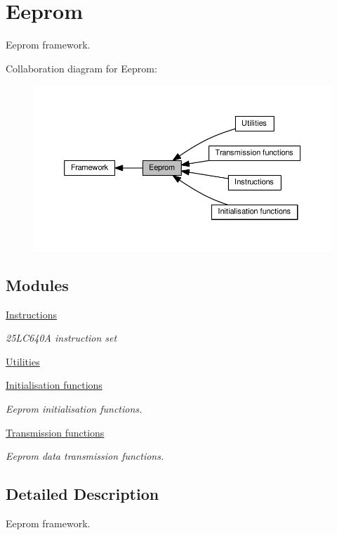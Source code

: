 \hypertarget{group___eeprom}{}\section{Eeprom}
\label{group___eeprom}


Eeprom framework.  


Collaboration diagram for Eeprom\+:\nopagebreak
\begin{figure}[H]
\begin{center}
\leavevmode
\includegraphics[width=350pt]{df/dce/group___eeprom}
\end{center}
\end{figure}
\subsection*{Modules}
\begin{DoxyCompactItemize}
\item 
\hyperlink{group___instructions}{Instructions}
\begin{DoxyCompactList}\small\item\em 25\+L\+C640A instruction set \end{DoxyCompactList}\item 
\hyperlink{group___utilities}{Utilities}
\item 
\hyperlink{group___eeprom___init}{Initialisation functions}
\begin{DoxyCompactList}\small\item\em Eeprom initialisation functions. \end{DoxyCompactList}\item 
\hyperlink{group___eeprom___trans}{Transmission functions}
\begin{DoxyCompactList}\small\item\em Eeprom data transmission functions. \end{DoxyCompactList}\end{DoxyCompactItemize}


\subsection{Detailed Description}
Eeprom framework. 

